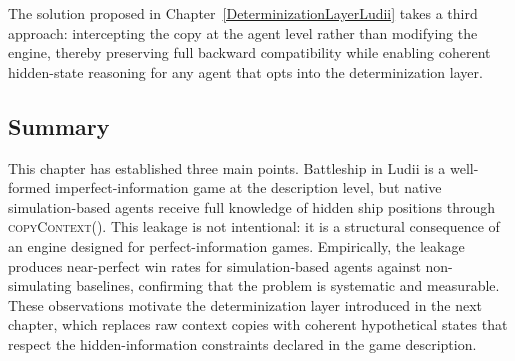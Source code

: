 The solution proposed in Chapter~\ref{DeterminizationLayerLudii} takes a third approach: intercepting the copy at the agent level rather than modifying the engine, thereby preserving full backward compatibility while enabling coherent hidden-state reasoning for any agent that opts into the determinization layer.

\subsection{Summary}

This chapter has established three main points. Battleship in Ludii is a well-formed imperfect-information game at the description level, but native simulation-based agents receive full knowledge of hidden ship positions through \textsc{copyContext()}. This leakage is not intentional: it is a structural consequence of an engine designed for perfect-information games. Empirically, the leakage produces near-perfect win rates for simulation-based agents against non-simulating baselines, confirming that the problem is systematic and measurable. These observations motivate the determinization layer introduced in the next chapter, which replaces raw context copies with coherent hypothetical states that respect the hidden-information constraints declared in the game description.
